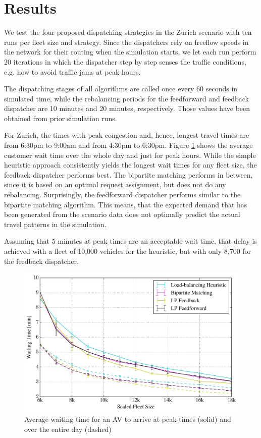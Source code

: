 \section{Results}
\label{sec:results}

We test the four proposed dispatching strategies in the Zurich scenario with ten
runs per fleet size and strategy. Since the dispatchers rely on freeflow speeds in the network
for their routing when the simulation starts, we let each run perform 20 iterations
in which the dispatcher step by step senses the traffic conditions, e.g. how to
avoid traffic jams at peak hours.

The dispatching stages of all algorithms are called once every 60 seconds in
simulated time, while the rebalancing periods for the feedforward and feedback
dispatcher are 10 minutes and 20 minutes, respectively. Those values have been
obtained from prior simulation runs.

For Zurich, the times with peak congestion and, hence, longest travel times
are from 6:30pm to 9:00am and from 4:30pm to 6:30pm. Figure \ref{fig:mean_peak_waiting_times}
shows the average customer wait time over the whole day and just for peak hours.
While the simple heuristic approach consistently yields the longest wait times
for any fleet size, the feedback dispatcher performs best. The bipartite matching
performs in between, since it is based on an optimal request assignment, but does
not do any rebalancing. Surprisingly, the feedforward dispatcher performs similar
to the bipartite matching algorithm. This means, that the expected demand that
has been generated from the scenario data does not optimally predict the actual
travel patterns in the simulation.

Assuming that 5 minutes at peak times are an acceptable wait time, that delay is
achieved with a fleet of 10,000 vehicles for the heuristic, but with only 8,700
for the feedback dispatcher.

\begin{figure}
\includegraphics[width=1.0\textwidth]{figures/mean_peak_waiting_times.pdf}
\caption{Average waiting time for an AV to arrive at peak times (solid) and over the entire day (dashed)}
\label{fig:mean_peak_waiting_times}
\end{figure}


